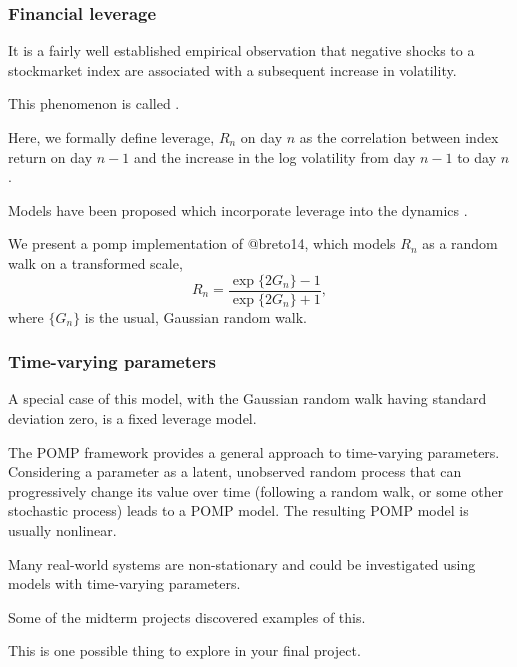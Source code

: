 \documentclass{beamer}\usepackage[]{graphicx}\usepackage[]{color}
\begin{document}
\begin{frame}[fragile]


\frametitle{Financial leverage}

\bi

\item It is a fairly well established empirical observation that negative shocks to a stockmarket index are associated with a subsequent increase in volatility. 

\item This phenomenon is called .

\item Here, we formally define leverage, $R_n$ on day $n$ as the correlation between index return on day $n-1$ and the increase in the log volatility from day $n-1$ to day $n$.

\item Models have been proposed which incorporate leverage into the dynamics \citep{breto14}.

\item We present a pomp implementation of @breto14, which models $R_n$ as a random walk on a transformed scale,
$$R_n= \frac{\exp\{2G_n\} -1}{\exp\{2G_n\}+1},$$
where $\{G_n\}$ is the usual, Gaussian random walk.

\ei

\end{frame}

\begin{frame}[fragile]


\frametitle{Time-varying parameters}

\bi

\item A special case of this model, with the Gaussian random walk having standard deviation zero, is a fixed leverage model.

\item The POMP framework provides a general approach to time-varying parameters. Considering a parameter as a latent, unobserved random process that can progressively change its value over time (following a random walk, or some other stochastic process) leads to a POMP model. The resulting POMP model is usually nonlinear.

\item Many real-world systems are non-stationary and could be investigated using models with time-varying parameters. 

\item Some of the midterm projects discovered examples of this.

\item This is one possible thing to explore in your final project.

\ei

\end{frame}
\end{document}
